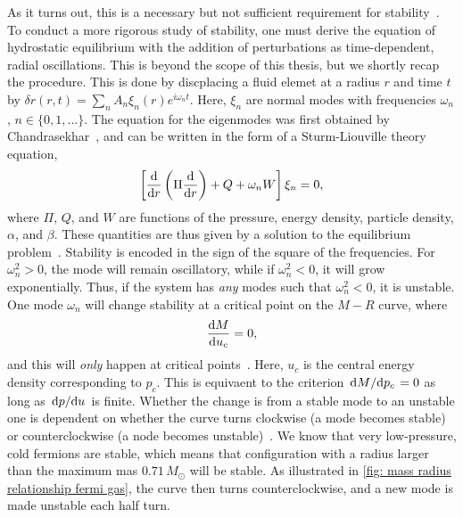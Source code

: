 As it turns out, this is a necessary but not sufficient requirement for stability~\autocite{glendenningCompactStarsNuclear2012}.
To conduct a more rigorous study of stability, one must derive the equation of hydrostatic equilibrium with the addition of perturbations as time-dependent, radial oscillations.
This is beyond the scope of this thesis, but we shortly recap the  procedure.
This is done by discplacing a fluid elemet at a radius $r$ and time $t$ by $\delta r(r, t) = \sum_n A_n \xi_n(r) e^{i \omega_n t}$.
Here, $\xi_n$ are normal modes with frequencies $\omega_n$, $n \in \{0, 1, ...\}$.
The equation for the eigenmodes was first obtained by Chandrasekhar~\autocite{chandrasekharDynamicalInstabilityGaseous1964}, and can be written in the form of a Sturm-Liouville theory equation,
%
\begin{equation}
    \left[     \odv{}{r} \left( \Pi \odv{}{r}  \right) + Q + \omega_n W \right] \xi_n
    = 0,
\end{equation}
%
where $\Pi$, $Q$, and $W$ are functions of the pressure, energy density, particle density, $\alpha$, and $\beta$.
These quantities are thus given by a solution to the equilibrium problem~\cite{glendenningCompactStarsNuclear2012}.
Stability is encoded in the sign of the square of the frequencies.
For $\omega_n^2>0$, the mode will remain oscillatory, while if $\omega_n^2<0$, it will grow exponentially.
Thus, if the system has \emph{any} modes such that $\omega_n^2<0$, it is unstable.
One mode $\omega_n$ will change stability at a critical point on the $M-R$ curve, where
%
\begin{equation}
    \odv{M}{u_c} = 0,
\end{equation}
%
and this will \emph{only} happen at critical points~\autocite{thorneGeneralRelativisticTheoryStellar1968}. Here, $u_c$ is the central energy density corresponding to $p_c$.
This is equivaent to the criterion $\odv{M}/{p_c} = 0$ as long as $\odv{p}/{u}$ is finite.
Whether the change is from a stable mode to an unstable one is dependent on whether the curve turns clockwise (a mode becomes stable) or counterclockwise (a node becomes unstable)~\autocite{thorneGeneralRelativisticTheoryStellar1968}.
We know that very low-pressure, cold fermions are stable, which means that configuration with a radius larger than the maximum mas $0.71 \, M_\odot$ will be stable.
As illustrated in \autoref{fig: mass radius relationship fermi gas}, the curve then turns counterclockwise, and a new mode is made unstable each half turn.
